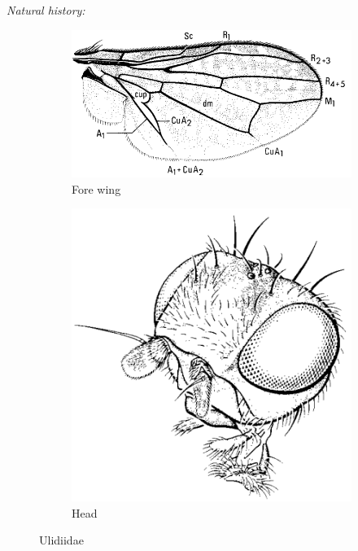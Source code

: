 \documentclass[letterpaper, 11pt]{article}
\begin{document}
\noindent{}\textit{Natural history:} \\

\begin{figure}[ht!]
    \centering
    \begin{subfigure}[ht!]{0.47\textwidth}
        \includegraphics[width=\textwidth]{UlidiidWing}
        \caption{Fore wing \citep[][Fig. 63.15]{mcalpine1981manualv2}}
        \label{fig:ulidiid1}
    \end{subfigure}
    \qquad
    \begin{subfigure}[ht!]{0.26\textwidth}
        \includegraphics[width=\textwidth]{UlidiidHead}
        \caption{Head \citep[][Fig. 63.7]{mcalpine1981manualv2}}
        \label{fig:ulidiid2}
    \end{subfigure}
    \caption{Ulidiidae}\label{fig:ulidiids}
\end{figure}
\end{document}
